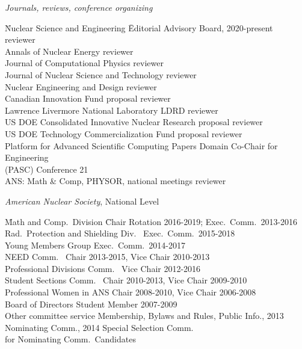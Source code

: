 \textit{Journals, reviews, conference organizing}
\begin{tabbing}
\hspace*{2 em}\= Nuclear Science and Engineering  \hspace*{8em} \= Editorial Advisory Board, 2020-present\\
 \>  \> reviewer\\
%
\> Annals of Nuclear Energy \> reviewer\\
%
\> Journal of Computational Physics \> reviewer\\
%
\> Journal of Nuclear Science and Technology \> reviewer\\
%
\> Nuclear Engineering and Design \> reviewer\\
%
\> Canadian Innovation Fund \> proposal reviewer\\
%
\> Lawrence Livermore  National Laboratory \> LDRD reviewer \\
%
\> US DOE Consolidated Innovative Nuclear Research \> proposal reviewer\\
%
\> US DOE Technology Commercialization Fund \> proposal reviewer\\
%
\> Platform for Advanced Scientific Computing  \> Papers Domain Co-Chair for Engineering\\
\>  \hspace*{2 em} (PASC) Conference 21\\
%
\> ANS: Math \& Comp, PHYSOR, national meetings \> reviewer
\end{tabbing}

\textit{American Nuclear Society}, National Level
\begin{tabbing}
\hspace*{2 em}\= Math and Comp.\ Division \hspace*{6em} \= Chair Rotation 2016-2019; Exec.\ Comm.\ 2013-2016 \\
%
\> Rad.\ Protection and Shielding Div.\ \> Exec.\ Comm.\ 2015-2018\\
%
\> Young Members Group \> Exec.\ Comm.\ 2014-2017\\
%
\> NEED Comm.\ \> Chair 2013-2015, Vice Chair 2010-2013\\
%
\> Professional Divisions Comm.\ \> Vice Chair 2012-2016 \\
%
\> Student Sections Comm.\ \> Chair 2010-2013, Vice Chair 2009-2010\\
%
\> Professional Women in ANS \> Chair 2008-2010, Vice Chair 2006-2008\\	
%
\> Board of Directors \> Student Member 2007-2009\\
%
\> Other committee service \>	Membership, Bylaws and Rules, Public Info., 2013 \\ \> \> Nominating Comm., 2014 Special Selection Comm.\ \\ \> \> for Nominating Comm.\ Candidates
\end{tabbing}

